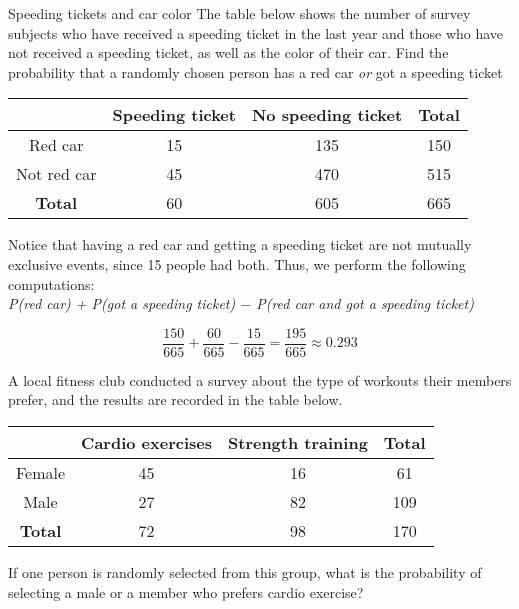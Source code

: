 \begin{example}[https://www.youtube.com/watch?v=QE9xCoQBclw]{Speeding tickets and car color} 
The table below shows the number of survey subjects who have received a speeding ticket in the last year and those who have not received a speeding ticket, as well as the color of their car. Find the probability that a randomly chosen person has a red car \emph{or} got a speeding ticket
\begin{center}
\begin{tabular}{|c|c|c|c|}
\hline
 & Speeding ticket & No speeding ticket& \textbf{Total} \\ \hline 
Red car & 15 & 135 & 150\\ \hline
Not red car & 45 & 470 & 515  \\ \hline
\textbf{Total} & 60 & 605 & 665 \\ \hline 
\end{tabular}
\end{center}	

 Notice that having a red car and getting a speeding ticket are not mutually exclusive events, since 15 people had both. Thus, we perform the following computations: \\

\emph{P(red car) + P(got a speeding ticket) $-$ P(red car and got a speeding ticket)} 

\[  \frac{150}{665} + \frac{60}{665} - \frac{15}{665}  = \frac{195}{665}  \approx 0.293\]
\end{example}

\begin{try}
A local fitness club conducted a survey about the type of workouts their members prefer, and the results are recorded in the table below.
\begin{center}
\begin{tabular}{|c|c|c|c|}
\hline
 & Cardio exercises & Strength training& \textbf{Total} \\ \hline 
Female & 45 & 16 & 61 \\ \hline
Male & 27 & 82 & 109  \\ \hline
\textbf{Total} & 72 & 98 & 170 \\ \hline 
\end{tabular}
\end{center}
If one person is randomly selected from this group, what is the probability of selecting a male or a member who prefers cardio exercise?
\end{try}
\pagebreak

